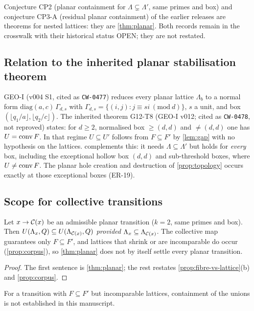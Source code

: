 \begin{corollary}\label{cor:CP}
Conjecture CP2 (planar containment for $\Lambda\subsetneq\Lambda'$, same primes and box) and conjecture CP3-A (residual planar containment) of the earlier releases are theorems for nested lattices: they are \cref{thm:planar}. Both records remain in the crosswalk with their historical status OPEN; they are not restated.
\end{corollary}

\subsection{Relation to the inherited planar stabilisation theorem}\label{sec:g12}
GEO-I (v004 S1, cited as \texttt{CW-0477}) reduces every planar lattice $\Lambda_b$ to a normal form $\mathrm{diag}(a,c)\,\Gamma_{d,s}$ with $\Gamma_{d,s}=\{(i,j):j\equiv si\ (\mathrm{mod}\ d)\}$, $s$ a unit, and box $(\lfloor q_1/a\rfloor,\lfloor q_2/c\rfloor)$. The inherited theorem G12-T8 (GEO-I v012; cited as \texttt{CW-0478}, not reproved) states: for $d\ge2$, normalised box $\ge(d,d)$ and $\ne(d,d)$ one has $U=\operatorname{conv} F$. In that regime $U\subseteq U'$ follows from $F\subseteq F'$ by \cref{lem:gap} with no hypothesis on the lattices.  complements this: it needs $\Lambda\subseteq\Lambda'$ but holds for \emph{every} box, including the exceptional hollow box $(d,d)$ and sub-threshold boxes, where $U\ne\operatorname{conv} F$. The planar hole creation and destruction of \cref{prop:topology} occurs exactly at those exceptional boxes (ER-19).

\subsection{Scope for collective transitions}\label{sec:p5p1a}
\begin{proposition}\label{prop:scope}
Let $x\to\mathcal C(x)$ be an admissible planar transition ($k=2$, same primes and box). Then $U(\Lambda_x,Q)\subseteq U(\Lambda_{\mathcal C(x)},Q)$ \emph{provided} $\Lambda_x\subseteq\Lambda_{\mathcal C(x)}$. The collective map guarantees only $F\subseteq F'$, and lattices that shrink or are incomparable do occur (\cref{prop:corpus}), so \cref{thm:planar} does not by itself settle every planar transition.
\end{proposition}
\begin{proof}
The first sentence is \cref{thm:planar}; the rest restates \cref{prop:fibre-vs-lattice}(b) and \cref{prop:corpus}. \qedhere
\end{proof}
For a transition with $F\subseteq F'$ but incomparable lattices, containment of the unions is not established in this manuscript.
